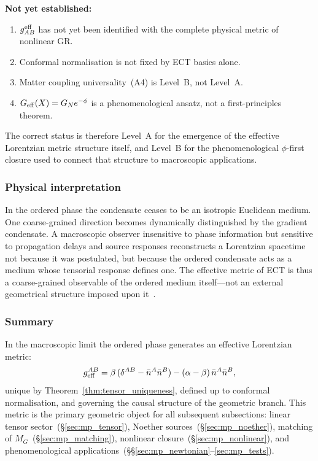 \textbf{Not yet established:}
\begin{enumerate}[label=(\roman*)]
  \item $g^{\rm eff}_{AB}$ has not yet been identified with the complete
    physical metric of nonlinear GR.
  \item Conformal normalisation is not fixed by ECT basics alone.
  \item Matter coupling universality~(A4) is Level~B, not Level~A.
  \item $G_{\rm eff}(X)=G_N e^{-\phi}$ is a phenomenological ansatz,
    not a first-principles theorem.
\end{enumerate}

The correct status is therefore Level~A for the emergence of the
effective Lorentzian metric structure itself, and Level~B for the
phenomenological $\phi$-first closure used to connect that structure
to macroscopic applications.

\subsubsection*{Physical interpretation}

In the ordered phase the condensate ceases to be an isotropic Euclidean
medium.
One coarse-grained direction becomes dynamically distinguished by the
gradient condensate.
A macroscopic observer insensitive to phase information but sensitive
to propagation delays and source responses reconstructs a Lorentzian
spacetime not because it was postulated, but because the ordered
condensate acts as a medium whose tensorial response defines one.
The effective metric of ECT is thus a coarse-grained observable of the
ordered medium itself---not an external geometrical structure imposed
upon it~\cite{Volovik2003}.

\subsubsection*{Summary}

In the macroscopic limit the ordered phase generates an effective
Lorentzian metric:
\begin{equation}
  \label{eq:geff_summary}
  g_{\rm eff}^{AB}
  = \beta\,(\delta^{AB}-\bar{n}^A\bar{n}^B)
  - (\alpha-\beta)\,\bar{n}^A\bar{n}^B,
\end{equation}
unique by Theorem~\ref{thm:tensor_uniqueness}, defined up to conformal
normalisation, and governing the causal structure of the geometric branch.
This metric is the primary geometric object for all subsequent
subsections: linear tensor sector~(\S\ref{sec:mp_tensor}), Noether
sources~(\S\ref{sec:mp_noether}), matching of $M_G$~(\S\ref{sec:mp_matching}),
nonlinear closure~(\S\ref{sec:mp_nonlinear}), and phenomenological
applications~(\S\S\ref{sec:mp_newtonian}--\ref{sec:mp_tests}).


